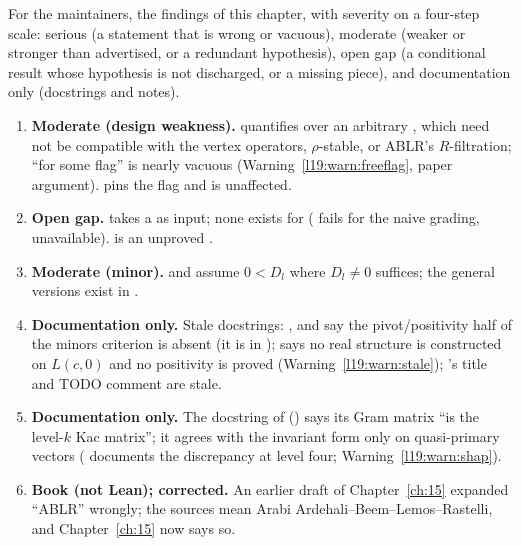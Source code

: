 For the maintainers, the findings of this chapter, with severity on a four-step scale:
serious (a statement that is wrong or vacuous), moderate (weaker or stronger than advertised, or a redundant
hypothesis), open gap (a conditional result whose hypothesis is not discharged, or a missing piece), and documentation
only (docstrings and notes).
\begin{enumerate}
\item \textbf{Moderate (design weakness).}  quantifies over an arbitrary ,
  which need not be compatible with the vertex operators, $\rho$-stable, or ABLR's $R$-filtration; ``for some
  flag'' is nearly vacuous (Warning~\ref{l19:warn:freeflag}, paper argument).  pins the flag
  and is unaffected.
\item \textbf{Open gap.}  takes a  as input; none exists for 
  ( fails for the naive grading,  unavailable).  is an unproved
  .
\item \textbf{Moderate (minor).} \allowbreak{}\allowbreak{}\allowbreak{}\allowbreak{}\allowbreak{} and  assume
  $0<D_l$ where $D_l\ne0$ suffices; the general versions exist in .
\item \textbf{Documentation only.} Stale docstrings: ,  and
   say the pivot/positivity half of the minors criterion is absent
  (it is in );  says no real structure is constructed
  on $L(c,0)$ and no positivity is proved (Warning~\ref{l19:warn:stale}); 's title and
  TODO comment are stale.
\item \textbf{Documentation only.} The docstring of  ()
  says its Gram matrix ``is the level-$k$ Kac matrix''; it agrees with the invariant form only on quasi-primary
  vectors ( documents the discrepancy at level four; Warning~\ref{l19:warn:shap}).
\item \textbf{Book (not Lean); corrected.} An earlier draft of Chapter~\ref{ch:15} expanded ``ABLR'' wrongly; the sources mean
  Arabi Ardehali--Beem--Lemos--Rastelli, and Chapter~\ref{ch:15} now says so.

\end{enumerate}
